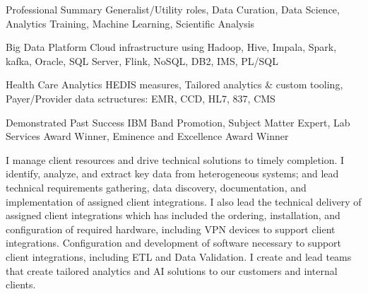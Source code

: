

\begin{cvskills}

  \cvskill
    {Professional Summary} %
    {Generalist/Utility roles, Data Curation, Data Science, Analytics Training, Machine Learning, Scientific Analysis} %

  \cvskill
    {Big Data Platform} %
    {Cloud infrastructure using Hadoop, Hive, Impala, Spark, kafka, Oracle, SQL Server, Flink, NoSQL, DB2, IMS, PL/SQL} %

  \cvskill
    {Health Care Analytics} %
    {HEDIS measures, Tailored analytics \& custom tooling, Payer/Provider data sctructures: EMR, CCD, HL7, 837, CMS} %

  \cvskill
    {Demonstrated Past Success} %
    {IBM Band Promotion, Subject Matter Expert, Lab Services Award Winner, Eminence and Excellence Award Winner} %

\end{cvskills}

\begin{cvparagraph}
  I manage client resources and drive technical solutions to timely completion.  I identify, analyze, and extract key data from heterogeneous systems; and lead technical requirements gathering, data discovery, documentation, and implementation of assigned client integrations.  I also lead the technical delivery of assigned client integrations which has included the ordering, installation, and configuration of required hardware, including VPN devices to support client integrations.  Configuration and development of software necessary to support client integrations, including ETL and Data Validation.  I create and lead teams that create tailored analytics and AI solutions to our customers and internal clients.
\end{cvparagraph}
    
